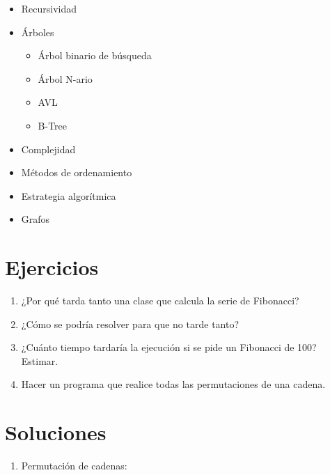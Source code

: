 \documentclass[a4paper]{report}
\begin{document}
            \begin{itemize}
                \item Recursividad
                \item Árboles
                    \begin{itemize}
                        \item Árbol binario de búsqueda
                        \item Árbol N-ario
                        \item AVL
                        \item B-Tree
                    \end{itemize}
                \item Complejidad
                \item Métodos de ordenamiento
                \item Estrategia algorítmica
                \item Grafos
            \end{itemize}

        \section{Ejercicios}

            \begin{enumerate}
                \item ¿Por qué tarda tanto una clase que calcula la serie de Fibonacci?
                \item ¿Cómo se podría resolver para que no tarde tanto?
                \item ¿Cuánto tiempo tardaría la ejecución si se pide un Fibonacci de 100? Estimar.
                \item Hacer un programa que realice todas las permutaciones de una cadena.
            \end{enumerate}

        \section{Soluciones}

            \begin{enumerate}
                \item Permutación de cadenas:
                    
            \end{enumerate}
\end{document}
